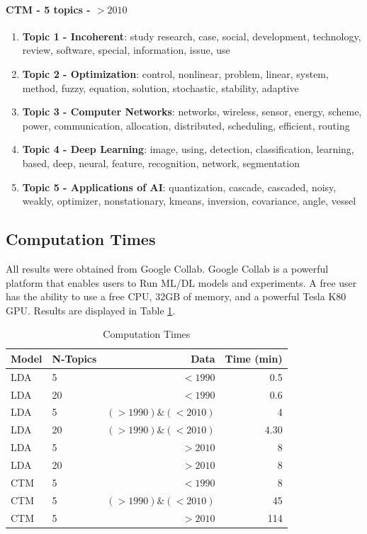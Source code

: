 \documentclass[fleqn,10pt]{SelfArx} %
\begin{document}
\vspace{0.2cm}

\paragraph{CTM - 5 topics - $> 2010$}
\begin{enumerate}
    \item \textbf{Topic 1 - Incoherent}: study research, case, social, development, technology, review, software, special, information, issue, use
    \item \textbf{Topic 2 - Optimization}: control, nonlinear, problem, linear, system, method, fuzzy, equation, solution, stochastic, stability, adaptive
    \item \textbf{Topic 3 - Computer Networks}: networks, wireless, sensor, energy, scheme, power, communication, allocation, distributed, scheduling, efficient, routing
    \item \textbf{Topic 4 - Deep Learning}: image, using, detection, classification, learning, based, deep, neural, feature, recognition, network, segmentation
    \item \textbf{Topic 5 - Applications of AI}: quantization, cascade, cascaded, noisy, weakly, optimizer, nonstationary, kmeans, inversion, covariance, angle, vessel
\end{enumerate}


\subsection{Computation Times}

All results were obtained from Google Collab. Google Collab is a powerful platform that enables users to Run ML/DL models and experiments. A free user has the ability to use a free CPU, 32GB of memory, and a powerful Tesla K80 GPU. Results are displayed in Table \ref{tab:ct}.

\begin{table}[hbt]
	\caption{Computation Times}
	\centering
	\begin{tabular}{llrr}
		\toprule
		  Model & N-Topics & Data & Time (min) \\
		\midrule
		LDA & 5 & $< 1990$ & 0.5\\
        LDA & 20 & $< 1990$ & 0.6\\
        LDA & 5 & $(> 1990) \& (< 2010)$ & 4\\
        LDA & 20 & $(> 1990) \& (< 2010)$ & 4.30\\
        LDA & 5 & $> 2010$ & 8\\
        LDA & 20 & $> 2010$ & 8\\
        CTM & 5 & $< 1990$ & 8\\
        CTM & 5 & $(> 1990) \& (< 2010)$ & 45\\
        CTM & 5 & $> 2010$ & 114\\
		\bottomrule
	\end{tabular}
	\label{tab:ct}
\end{table}
\end{document}
